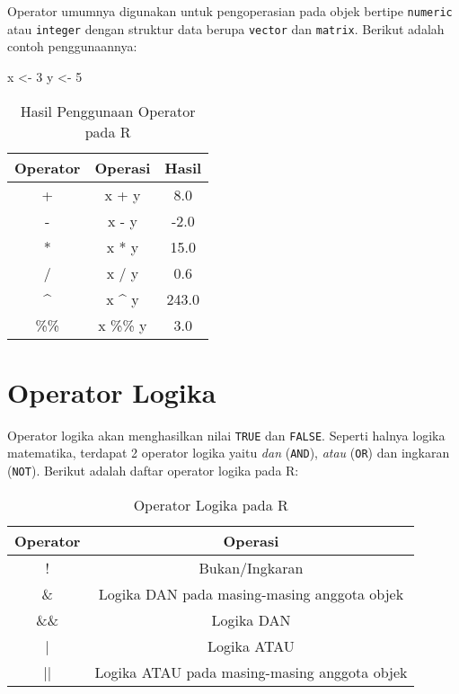 \documentclass[
]{book}
\newenvironment{Shaded}{\begin{snugshade}}{\end{snugshade}}
\newcommand{\DecValTok}[1]{\textcolor[rgb]{0.00,0.00,0.81}{#1}}
\newcommand{\NormalTok}[1]{#1}
\newcommand{\OtherTok}[1]{\textcolor[rgb]{0.56,0.35,0.01}{#1}}
\begin{document}
Operator umumnya digunakan untuk pengoperasian pada objek bertipe \texttt{numeric} atau \texttt{integer} dengan struktur data berupa \texttt{vector} dan \texttt{matrix}. Berikut adalah contoh penggunaannya:

\begin{Shaded}
\begin{Highlighting}[]
\NormalTok{x }\OtherTok{\textless{}{-}} \DecValTok{3}
\NormalTok{y }\OtherTok{\textless{}{-}} \DecValTok{5}
\end{Highlighting}
\end{Shaded}

\begin{table}

\caption{\label{tab:unnamed-chunk-25}Hasil Penggunaan Operator pada R}
\centering
\begin{tabular}[t]{ccc}
\toprule
Operator & Operasi & Hasil\\
\midrule
+ & x + y & 8.0\\
- & x - y & -2.0\\
* & x * y & 15.0\\
/ & x / y & 0.6\\
\textasciicircum{} & x \textasciicircum{} y & 243.0\\
\addlinespace
\%\% & x \%\% y & 3.0\\
\bottomrule
\end{tabular}
\end{table}

\hypertarget{operator-logika}{%
\section{Operator Logika}\label{operator-logika}}

Operator logika akan menghasilkan nilai \texttt{TRUE} dan \texttt{FALSE}. Seperti halnya logika matematika, terdapat 2 operator logika yaitu \emph{dan} (\texttt{AND}), \emph{atau} (\texttt{OR}) dan ingkaran (\texttt{NOT}). Berikut adalah daftar operator logika pada R:

\begin{table}

\caption{\label{tab:unnamed-chunk-26}Operator Logika pada R}
\centering
\begin{tabular}[t]{cc}
\toprule
Operator & Operasi\\
\midrule
! & Bukan/Ingkaran\\
\& & Logika DAN pada masing-masing anggota objek\\
\&\& & Logika DAN\\
| & Logika ATAU\\
|| & Logika ATAU pada masing-masing anggota objek\\
\bottomrule
\end{tabular}
\end{table}
\end{document}
